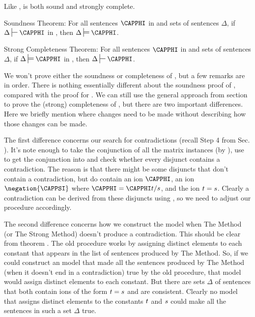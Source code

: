 Like \GQD{}, \GQDI{} is both sound and strongly complete.
\begin{THEOREM}{ \GQDI{} Soundness Theorem:}
For all sentences $\CAPPHI$ in \GQLI{} and sets of sentences $\Delta$, if $\Delta\sststile{}{}\CAPPHI$ in \GQDI{}, then $\Delta\sdtstile{}{}\CAPPHI$.
\end{THEOREM}
\begin{THEOREM}{ \GQDI{} Strong Completeness Theorem:}
For all sentences $\CAPPHI$ in \GQLI{} and sets of sentences $\Delta$, if $\Delta\sdtstile{}{}\CAPPHI$ in \GQDI{}, then $\Delta\sststile{}{}\CAPPHI$.
\end{THEOREM}
\noindent{}We won't prove either the soundness or completeness of \GQDI{}, but a few remarks are in order.
There is nothing essentially different about the soundness proof of \GQDI{}, compared with the proof for \GQD{}.
We can still use the general approach from section  to prove the (strong) completeness of \GQDI{}, but there are two important differences.
Here we briefly mention where changes need to be made without describing how those changes can be made.

The first difference concerns our search for contradictions (recall Step 4 from Sec. ). 
It's note enough to take the conjunction of all the matrix instances (by ), use  to get the conjunction into  and check whether every disjunct contains a contradiction. 
The reason is that there might be some disjuncts that don't contain a contradiction, but do contain an ion $\CAPPHI$, an ion $\negation{\CAPPSI}$ where $\CAPPHI=\CAPPHI\variable{t}/\variable{s}$, and the ion $t=s$. 
Clearly a contradiction can be derived from these disjuncts using , so we need to adjust our procedure accordingly. 

The second difference concerns how we construct the model when The Method (or The Strong Method) doesn't produce a contradiction. 
This should be clear from theorem .
The old procedure works by assigning distinct elements to each constant that appears in the list of sentences produced by The Method. 
So, if we could construct an model that made all the sentences produced by The Method (when it doesn't end in a contradiction) true by the old procedure, that model would assign distinct elements to each constant.
But there are sets $\Delta$ of \GQLI{} sentences that both contain ions of the form $t=s$ and are consistent. 
Clearly no model that assigns distinct elements to the constants $t$ and $s$ could make all the sentences in such a set $\Delta$ true. 

